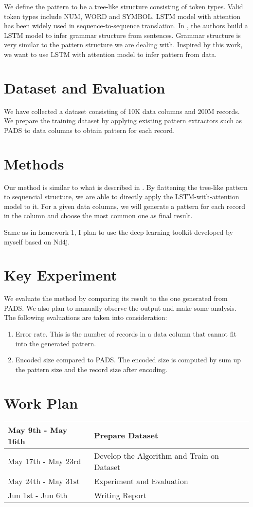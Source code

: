 \documentclass{article}
\begin{document}
We define the pattern to be a tree-like structure consisting of token types. Valid
token types include NUM, WORD and SYMBOL. LSTM model with attention has been widely
used in sequence-to-sequence translation. In \cite{grammar_2014}, the authors build
a LSTM model to infer grammar structure from sentences. Grammar structure is very similar
to the pattern structure we are dealing with. Inspired by this work, we want to use
LSTM with attention model to infer pattern from data.

\section{Dataset and Evaluation}
We have collected a dataset consisting of 10K data columns and 200M records. We
prepare the training dataset by applying existing pattern extractors such as
PADS\cite{pads_2008} to data columns to obtain pattern for each record.

\section{Methods}

Our method is similar to what is described in \cite{grammar_2014}. By flattening
the tree-like pattern to sequencial structure, we are able to directly apply the
LSTM-with-attention model to it. For a given data columns, we will generate a
pattern for each record in the column and choose the most common one as final result.

Same as in homework 1, I plan to use the deep learning toolkit developed by
myself based on Nd4j. 
\section{Key Experiment}
We evaluate the method by comparing its result to the one generated from PADS.
We also plan to manually observe the output and make some analysis. The
following evaluations are taken into consideration:
\begin{enumerate}
  \item Error rate. This is the number of records in a data column that cannot
  fit into the generated pattern.
  \item Encoded size compared to PADS. The encoded size is computed by sum up
  the pattern size and the record size after encoding.
\end{enumerate}

\section{Work Plan}
\begin{tabular}{l|l}
May 9th - May 16th & Prepare Dataset\\
\hline
May 17th - May 23rd & Develop the Algorithm and Train on Dataset\\
\hline
May 24th - May 31st & Experiment and Evaluation \\
\hline
Jun 1st - Jun 6th & Writing Report
\end{tabular}



\end{document}
